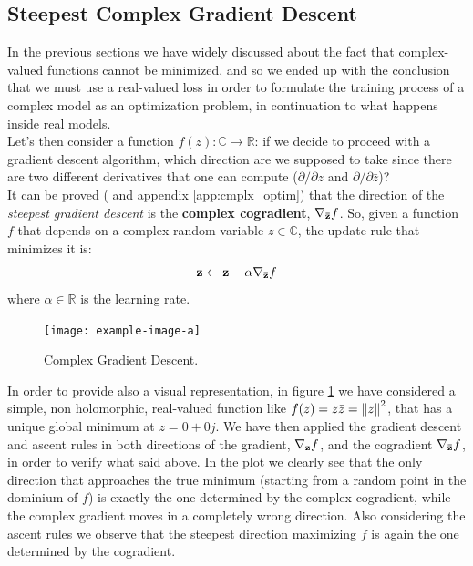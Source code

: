 \documentclass[../main.tex]{subfiles}
\begin{document}
\subsection{Steepest Complex Gradient Descent}
\label{sec:steepest_cmplx_gradient_descent}
In the previous sections we have widely discussed about the fact that complex-valued functions cannot be minimized, and so we ended up with the conclusion that we must use a real-valued loss in order to formulate the training process of a complex model as an optimization problem, in continuation to what happens inside real models.\\
Let's then consider a function $f(z):\mathds{C}\to\mathds{R}$: if we decide to proceed with a gradient descent algorithm, which direction are we supposed to take since there are two different derivatives that one can compute ($\partial/\partial z$ and $\partial/\partial \bar{z}$)?\\
It can be proved (\cite{amin_wirtinger, Hualiang_nonlinear} and appendix \ref{app:cmplx_optim}) that the direction of the \textit{steepest gradient descent} is the \textbf{complex cogradient}, $\vb{\nabla_{\bar{z}}}f$. So, given a function $f$ that depends on a complex random variable $z\in\mathds{C}$, the update rule that minimizes it is:
\begin{equation}
	\vb{z} \leftarrow \vb{z} - \alpha\vb{\nabla_{\bar{z}}}f
	\label{eq:cmplx_gradient_descent}
\end{equation}
where $\alpha\in\mathds{R}$ is the learning rate.

\begin{figure}[!ht]
	\centering
	\texttt{[image: example-image-a]}
	\caption{Complex Gradient Descent.}
	\label{fig:cmplx_gradient_descent}
\end{figure}

In order to provide also a visual representation, in figure \ref{fig:cmplx_gradient_descent} we have considered a simple, non holomorphic, real-valued function like $f(z) = z\bar{z} = \norm{z}^2$, that has a unique global minimum at $z=0+0j$. We have then applied the gradient descent and ascent rules in both directions of the gradient, $\vb{\nabla_z}f$, and the cogradient $\vb{\nabla_{\bar{z}}}f$, in order to verify what said above. In the plot we clearly see that the only direction that approaches the true minimum (starting from a random point in the dominium of $f$) is exactly the one determined by the complex cogradient, while the complex gradient moves in a completely wrong direction. Also considering the ascent rules we observe that the steepest direction maximizing $f$ is again the one determined by the cogradient.\\
\end{document}
